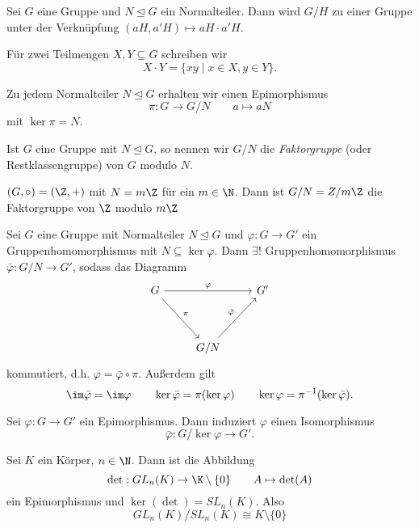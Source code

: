 \begin{lem}
	Sei $G$ eine Gruppe und $N \unlhd G$ ein Normalteiler. Dann wird $G/H$ zu einer Gruppe unter der Verknüpfung $(aH,a'H) \mapsto aH \cdot a'H$.
\end{lem}

\begin{rem*}
	Für zwei Teilmengen $X,Y \subseteq G$ schreiben wir $$X \cdot Y = \{xy \mid x \in X, y \in Y\}.$$
\end{rem*}

Zu jedem Normalteiler $N \unlhd G$ erhalten wir einen Epimorphismus
\[ \pi: G \to G/N \qquad a \mapsto aN \]
mit $\ker \pi = N$.

\begin{defn*}[Faktorgruppe]
	Ist $G$ eine Gruppe mit $N \unlhd G$, so nennen wir $G/N$ die \emph{Faktorgruppe} (oder Restklassengruppe) von $G$ modulo $N$.
\end{defn*}

\begin{exmp*}
	$(G,\circ) = (\Z,+)$ mit $N = m\Z$ für ein $m \in \N$. Dann ist $G/N = Z /m\Z$ die Faktorgruppe von $\Z$ modulo $m\Z$
\end{exmp*}

\begin{thm}[Homomorphiesatz]
	Sei $G$ eine Gruppe mit Normalteiler $N \unlhd G$ und $\varphi: G \to G'$ ein Gruppenhomomorphismus mit $N \subseteq \ker\varphi$. Dann $\exists!$ Gruppenhomomorphismus $\bar{\varphi}: G/N \to G'$, sodass das Diagramm
	\[ \begin{tikzcd}
		G\arrow{rr}{\varphi}  \arrow{ddr}{\pi} & & G'\\
		&&\\
		& G/N \arrow{uur}{\bar{\varphi}}&
	\end{tikzcd} \]
	kommutiert, d.h. $\varphi = \bar{\varphi} \circ \pi.$ Außerdem gilt
	\[ \im \bar{\varphi} = \im \varphi \qquad \ker \bar{\varphi} = \pi(\ker\varphi) \qquad \ker\varphi = \pi^{-1} (\ker\bar{\varphi}). \]
\end{thm}

\begin{cor}
	Sei $ \varphi: G \to G' $ ein Epimorphismus. Dann induziert $\varphi$ einen Isomorphismus
	\[ \bar{\varphi}: G/\ker\varphi \to G'. \]
\end{cor}

\begin{exmp*}
	Sei $K$ ein Körper, $n \in \N$. Dann ist die Abbildung
	\[ \det: GL_n(K) \to \K \setminus\{0\} \qquad A \mapsto \det(A) \]
	ein Epimorphismus und $\ker(\det) = SL_n(K)$. Also
	\[ GL_n(K)/SL_n(K) \cong K \setminus \{0\} \]
\end{exmp*}

